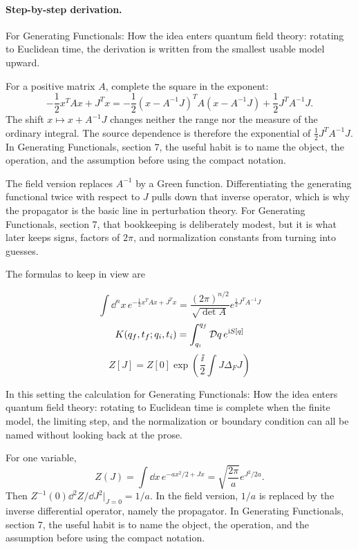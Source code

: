 \paragraph{Step-by-step derivation.}

For Generating Functionals: How the idea enters quantum field theory: rotating to Euclidean time, the derivation is written from the smallest usable model upward.

For a positive matrix \(A\), complete the square in the exponent:
\[
  -\frac12x^TAx+J^Tx
  =
  -\frac12(x-A^{-1}J)^TA(x-A^{-1}J)
  +\frac12J^TA^{-1}J.
\]
The shift \(x\mapsto x+A^{-1}J\) changes neither the range nor the measure of the ordinary integral.  The source dependence is therefore the exponential of \(\frac12J^TA^{-1}J\).  In Generating Functionals, section 7, the useful habit is to name the object, the operation, and the assumption before using the compact notation.

The field version replaces \(A^{-1}\) by a Green function.  Differentiating the generating functional twice with respect to \(J\) pulls down that inverse operator, which is why the propagator is the basic line in perturbation theory.  For Generating Functionals, section 7, that bookkeeping is deliberately modest, but it is what later keeps signs, factors of \(2\pi\), and normalization constants from turning into guesses.

The formulas to keep in view are

\[
  \int\dd^n x\,e^{-\frac12x^TAx+J^Tx}=\frac{(2\pi)^{n/2}}{\sqrt{\det A}}e^{\frac12J^TA^{-1}J}
\]
\[
  K(q_f,t_f;q_i,t_i)=\int_{q_i}^{q_f}\mathcal D q\,e^{\mathrm i S[q]}
\]
\[
  Z[J]=Z[0]\exp\left(\frac{\ii}{2}\int J\Delta_FJ\right)
\]

In this setting the calculation for Generating Functionals: How the idea enters quantum field theory: rotating to Euclidean time is complete when the finite model, the limiting step, and the normalization or boundary condition can all be named without looking back at the prose.




\begin{example}
For one variable,
\[
  Z(J)=\int\dd x\,e^{-ax^2/2+Jx}
  =\sqrt{\frac{2\pi}{a}}e^{J^2/2a}.
\]
Then \(Z^{-1}(0)\dd^2Z/\dd J^2|_{J=0}=1/a\).  In the field version, \(1/a\) is replaced by the inverse differential operator, namely the propagator.  In Generating Functionals, section 7, the useful habit is to name the object, the operation, and the assumption before using the compact notation.
\end{example}



